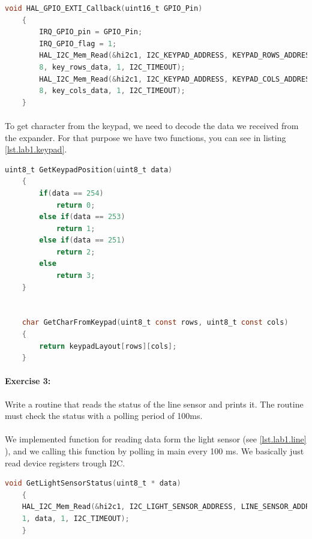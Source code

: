 \documentclass[english]{article}
\begin{document}
		\begin{lstlisting}[language=C, caption={Keypad callback function}, label={lst.lab1.callback} ]
	void HAL_GPIO_EXTI_Callback(uint16_t GPIO_Pin)
	{
		IRQ_GPIO_pin = GPIO_Pin;
		IRQ_GPIO_flag = 1;
		HAL_I2C_Mem_Read(&hi2c1, I2C_KEYPAD_ADDRESS, KEYPAD_ROWS_ADDRESS,
		8, key_rows_data, 1, I2C_TIMEOUT);
		HAL_I2C_Mem_Read(&hi2c1, I2C_KEYPAD_ADDRESS, KEYPAD_COLS_ADDRESS,
		8, key_cols_data, 1, I2C_TIMEOUT);
	}
		\end{lstlisting}


		\paragraph{}
		To get character from the keypad, we need to decode the data we received from the expander. For that purpose we have two functions,
		you can see in listing \ref{lst.lab1.keypad}. %

		\begin{lstlisting}[language=C, caption={Keypad get cahr functions}, label={lst.lab1.keypad} ]
	uint8_t GetKeypadPosition(uint8_t data)
	{
		if(data == 254)
			return 0;
		else if(data == 253)
			return 1;
		else if(data == 251)
			return 2;
		else
			return 3;
	}


	char GetCharFromKeypad(uint8_t const rows, uint8_t const cols)
	{
		return keypadLayout[rows][cols];
	}
		\end{lstlisting}

		\paragraph{Exercise 3:}
		Write a routine that reads the status of the line sensor and prints it. The routine must check the status with a
        polling period of 100ms.

		\paragraph{}
		We implemented function for reading data form the light sensor (see \ref{lst.lab1.line} ), and we calling this function by polling in main every 
		100 ms. We basically just read device registers trough I2C.

		\begin{lstlisting}[language=C, caption={Keypad get cahr functions}, label={lst.lab1.line} ]
	void GetLightSensorStatus(uint8_t * data)
	{
	HAL_I2C_Mem_Read(&hi2c1, I2C_LIGHT_SENSOR_ADDRESS, LINE_SENSOR_ADDRESS,
	1, data, 1, I2C_TIMEOUT);
	}
		\end{lstlisting}
\end{document}
